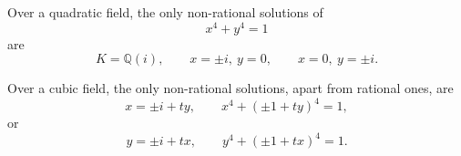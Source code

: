 \begin{proposition}
    Over a quadratic field, the only non-rational solutions of
\[
    x^4+y^4=1
\]
    are
\[
    K=\mathbb{Q}(i),\qquad x=\pm i,\ y=0,\qquad x=0,\ y=\pm i.
\]
\end{proposition}

\begin{proposition}
    Over a cubic field, the only non-rational solutions, apart from rational ones, are
\[
    x=\pm i+ty,\qquad x^4+(\pm1+ty)^4=1,
\]
    or
\[
    y=\pm i+tx,\qquad y^4+(\pm1+tx)^4=1.
\]
\end{proposition}
